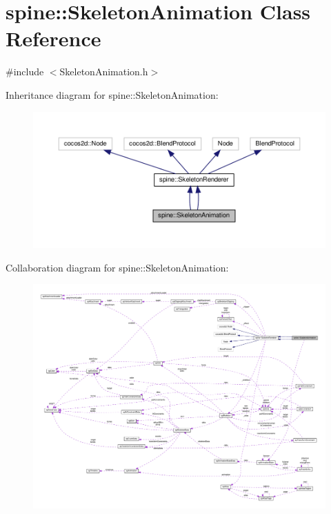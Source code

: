 \hypertarget{classspine_1_1SkeletonAnimation}{}\section{spine\+:\+:Skeleton\+Animation Class Reference}
\label{classspine_1_1SkeletonAnimation}


{\ttfamily \#include $<$Skeleton\+Animation.\+h$>$}



Inheritance diagram for spine\+:\+:Skeleton\+Animation\+:
\nopagebreak
\begin{figure}[H]
\begin{center}
\leavevmode
\includegraphics[width=350pt]{classspine_1_1SkeletonAnimation__inherit__graph}
\end{center}
\end{figure}


Collaboration diagram for spine\+:\+:Skeleton\+Animation\+:
\nopagebreak
\begin{figure}[H]
\begin{center}
\leavevmode
\includegraphics[width=350pt]{classspine_1_1SkeletonAnimation__coll__graph}
\end{center}
\end{figure}
